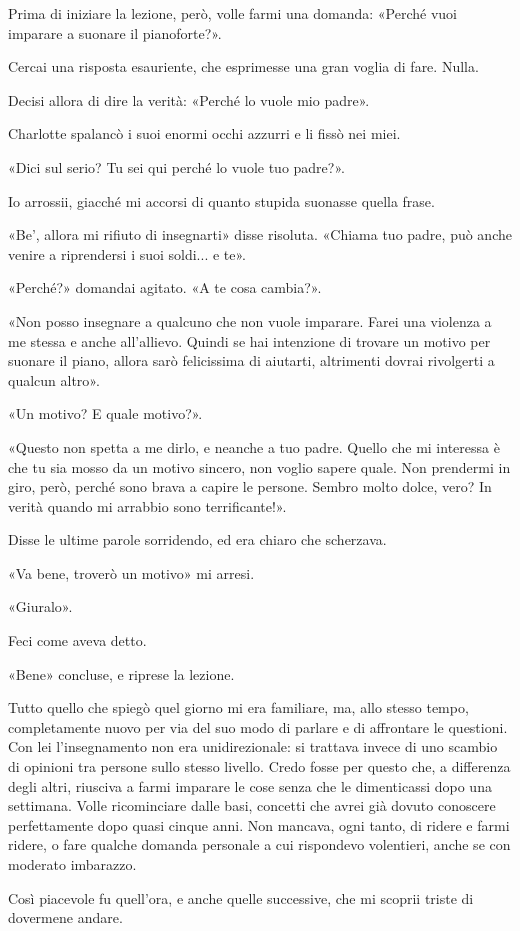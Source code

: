 \documentclass[a4paper,11pt,oneside,openright,final]{memoir}
\begin{document}
Prima di iniziare la lezione, però, volle farmi una domanda: «Perché vuoi
imparare a suonare il pianoforte?».

Cercai una risposta esauriente, che esprimesse una gran voglia di fare. Nulla.

Decisi allora di dire la verità: «Perché lo vuole mio padre».

Charlotte spalancò i suoi enormi occhi azzurri e li fissò nei miei.

«Dici sul serio? Tu sei qui perché lo vuole tuo padre?».

Io arrossii, giacché mi accorsi di quanto stupida suonasse quella frase.

«Be', allora mi rifiuto di insegnarti» disse risoluta. «Chiama tuo padre, può
anche venire a riprendersi i suoi soldi... e te».

«Perché?» domandai agitato. «A te cosa cambia?».

«Non posso insegnare a qualcuno che non vuole imparare. Farei una violenza a me
stessa e anche all'allievo. Quindi se hai intenzione di trovare un motivo per
suonare il piano, allora sarò felicissima di aiutarti, altrimenti dovrai
rivolgerti a qualcun altro».

«Un motivo? E quale motivo?».

«Questo non spetta a me dirlo, e neanche a tuo padre. Quello che mi interessa è
che tu sia mosso da un motivo sincero, non voglio sapere quale. Non prendermi in
giro, però, perché sono brava a capire le persone. Sembro molto dolce, vero? In
verità quando mi arrabbio sono terrificante!».

Disse le ultime parole sorridendo, ed era chiaro che scherzava.

«Va bene, troverò un motivo» mi arresi.

«Giuralo».

Feci come aveva detto.

«Bene» concluse, e riprese la lezione.

Tutto quello che spiegò quel giorno mi era familiare, ma, allo stesso tempo,
completamente nuovo per via del suo modo di parlare e di affrontare le
questioni. Con lei l'insegnamento non era unidirezionale: si trattava invece di
uno scambio di opinioni tra persone sullo stesso livello. Credo fosse per questo
che, a differenza degli altri, riusciva a farmi imparare le cose senza che le
dimenticassi dopo una settimana. Volle ricominciare dalle basi, concetti che
avrei già dovuto conoscere perfettamente dopo quasi cinque anni. Non mancava,
ogni tanto, di ridere e farmi ridere, o fare qualche domanda personale a cui
rispondevo volentieri, anche se con moderato imbarazzo.

Così piacevole fu quell'ora, e anche quelle successive, che mi scoprii triste di
dovermene andare.

\clearpage

\tableofcontents
\end{document}
